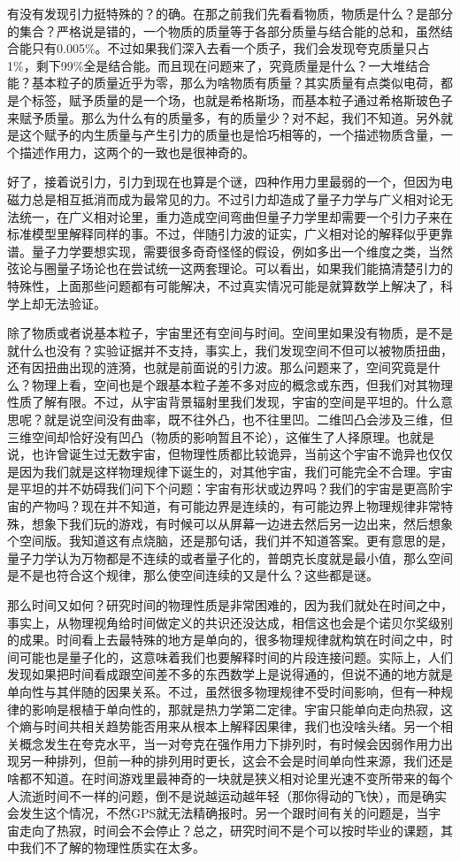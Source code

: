 \documentclass[
]{book}
\begin{document}
有没有发现引力挺特殊的？的确。在那之前我们先看看物质，物质是什么？是部分的集合？严格说是错的，一个物质的质量等于各部分质量与结合能的总和，虽然结合能只有0.005\%。不过如果我们深入去看一个质子，我们会发现夸克质量只占1\%，剩下99\%全是结合能。而且现在问题来了，究竟质量是什么？一大堆结合能？基本粒子的质量近乎为零，那么为啥物质有质量？其实质量有点类似电荷，都是个标签，赋予质量的是一个场，也就是希格斯场，而基本粒子通过希格斯玻色子来赋予质量。那么为什么有的质量多，有的质量少？对不起，我们不知道。另外就是这个赋予的内生质量与产生引力的质量也是恰巧相等的，一个描述物质含量，一个描述作用力，这两个的一致也是很神奇的。

好了，接着说引力，引力到现在也算是个谜，四种作用力里最弱的一个，但因为电磁力总是相互抵消而成为最常见的力。不过引力却造成了量子力学与广义相对论无法统一，在广义相对论里，重力造成空间弯曲但量子力学里却需要一个引力子来在标准模型里解释同样的事。不过，伴随引力波的证实，广义相对论的解释似乎更靠谱。量子力学要想实现，需要很多奇奇怪怪的假设，例如多出一个维度之类，当然弦论与圈量子场论也在尝试统一这两套理论。可以看出，如果我们能搞清楚引力的特殊性，上面那些问题都有可能解决，不过真实情况可能是就算数学上解决了，科学上却无法验证。

除了物质或者说基本粒子，宇宙里还有空间与时间。空间里如果没有物质，是不是就什么也没有？实验证据并不支持，事实上，我们发现空间不但可以被物质扭曲，还有因扭曲出现的涟漪，也就是前面说的引力波。那么问题来了，空间究竟是什么？物理上看，空间也是个跟基本粒子差不多对应的概念或东西，但我们对其物理性质了解有限。不过，从宇宙背景辐射里我们发现，宇宙的空间是平坦的。什么意思呢？就是说空间没有曲率，既不往外凸，也不往里凹。二维凹凸会涉及三维，但三维空间却恰好没有凹凸（物质的影响暂且不论），这催生了人择原理。也就是说，也许曾诞生过无数宇宙，但物理性质都比较诡异，当前这个宇宙不诡异也仅仅是因为我们就是这样物理规律下诞生的，对其他宇宙，我们可能完全不合理。宇宙是平坦的并不妨碍我们问下个问题：宇宙有形状或边界吗？我们的宇宙是更高阶宇宙的产物吗？现在并不知道，有可能边界是连续的，有可能边界上物理规律非常特殊，想象下我们玩的游戏，有时候可以从屏幕一边进去然后另一边出来，然后想象个空间版。我知道这有点烧脑，还是那句话，我们并不知道答案。更有意思的是，量子力学认为万物都是不连续的或者量子化的，普朗克长度就是最小值，那么空间是不是也符合这个规律，那么使空间连续的又是什么？这些都是谜。

那么时间又如何？研究时间的物理性质是非常困难的，因为我们就处在时间之中，事实上，从物理视角给时间做定义的共识还没达成，相信这也会是个诺贝尔奖级别的成果。时间看上去最特殊的地方是单向的，很多物理规律就构筑在时间之中，时间可能也是量子化的，这意味着我们也要解释时间的片段连接问题。实际上，人们发现如果把时间看成跟空间差不多的东西数学上是说得通的，但说不通的地方就是单向性与其伴随的因果关系。不过，虽然很多物理规律不受时间影响，但有一种规律的影响是根植于单向性的，那就是热力学第二定律。宇宙只能单向走向热寂，这个熵与时间共相关趋势能否用来从根本上解释因果律，我们也没啥头绪。另一个相关概念发生在夸克水平，当一对夸克在强作用力下排列时，有时候会因弱作用力出现另一种排列，但前一种的排列用时更长，这会不会是时间单向性来源，我们还是啥都不知道。在时间游戏里最神奇的一块就是狭义相对论里光速不变所带来的每个人流逝时间不一样的问题，倒不是说越运动越年轻（那你得动的飞快），而是确实会发生这个情况，不然GPS就无法精确报时。另一个跟时间有关的问题是，当宇宙走向了热寂，时间会不会停止？总之，研究时间不是个可以按时毕业的课题，其中我们不了解的物理性质实在太多。
\end{document}
